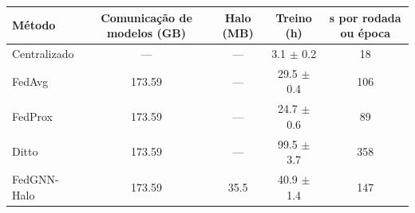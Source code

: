
\begin{tabular}{lcccc}
\toprule
Método & Comunicação de modelos (GB) & Halo (MB) & Treino (h) & s por rodada ou época \\
\midrule
Centralizado & --- & --- & \num{3.1} $\pm$ \num{0.2} & \num{18} \\
FedAvg & \num{173.59} & --- & \num{29.5} $\pm$ \num{0.4} & \num{106} \\
FedProx & \num{173.59} & --- & \num{24.7} $\pm$ \num{0.6} & \num{89} \\
Ditto & \num{173.59} & --- & \num{99.5} $\pm$ \num{3.7} & \num{358} \\
FedGNN-Halo & \num{173.59} & \num{35.5} & \num{40.9} $\pm$ \num{1.4} & \num{147} \\
\bottomrule
\end{tabular}
